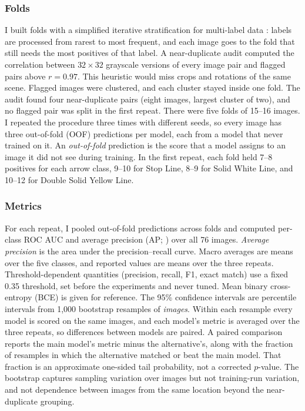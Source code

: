 \documentclass[11pt]{article}
\begin{document}
\subsubsection*{Folds}
I built folds with a simplified iterative stratification for multi-label data \citep{sechidis2011}: labels are processed from rarest to most frequent, and each image goes to the fold that still needs the most positives of that label. A near-duplicate audit computed the correlation between $32\times32$ grayscale versions of every image pair and flagged pairs above $r=0.97$. This heuristic would miss crops and rotations of the same scene. Flagged images were clustered, and each cluster stayed inside one fold. The audit found four near-duplicate pairs (eight images, largest cluster of two), and no flagged pair was split in the first repeat. There were five folds of 15--16 images. I repeated the procedure three times with different seeds, so every image has three out-of-fold (OOF) predictions per model, each from a model that never trained on it. An \emph{out-of-fold} prediction is the score that a model assigns to an image it did not see during training. In the first repeat, each fold held 7--8 positives for each arrow class, 9--10 for Stop Line, 8--9 for Solid White Line, and 10--12 for Double Solid Yellow Line.

\subsubsection*{Metrics}
For each repeat, I pooled out-of-fold predictions across folds and computed per-class ROC AUC and average precision (AP; \citealt{saito2015}) over all 76 images. \emph{Average precision} is the area under the precision--recall curve. Macro averages are means over the five classes, and reported values are means over the three repeats. Threshold-dependent quantities (precision, recall, F1, exact match) use a fixed 0.35 threshold, set before the experiments and never tuned. Mean binary cross-entropy (BCE) is given for reference. The 95\% confidence intervals are percentile intervals from 1,000 bootstrap resamples of \emph{images}. Within each resample every model is scored on the same images, and each model's metric is averaged over the three repeats, so differences between models are paired. A paired comparison reports the main model's metric minus the alternative's, along with the fraction of resamples in which the alternative matched or beat the main model. That fraction is an approximate one-sided tail probability, not a corrected $p$-value. The bootstrap captures sampling variation over images but not training-run variation, and not dependence between images from the same location beyond the near-duplicate grouping.
\end{document}
